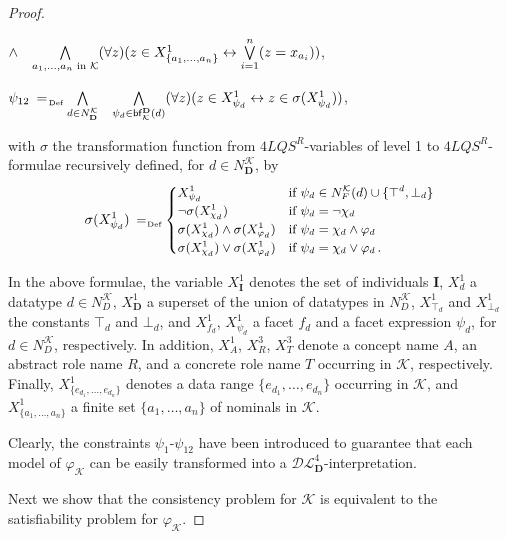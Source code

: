 \documentclass[a4paper]{llncs}
\newcommand{\defAs}{\mathrel{\makebox{\:= \hspace{-.2cm} \raisebox{-0.5 ex}[0 ex][0 ex]{\tiny Def}}}}
\newcommand{\shdlss}{\mathcal{DL}_{\D}^{4}}
\newcommand{\flqsr}{\ensuremath{4LQS^R}}
\newcommand{\I}{\mathbf{I}}
\newcommand{\D}{\mathbf{D}}
\newcommand{\bfk}{\mathsf{bf}_\mathcal{K}^{\D}}
\begin{document}
\begin{proof}
\begin{itemize}
{$\hfill \wedge \quad \underset {a_{1},\ldots, a_{n} \textrm{ in } \mathcal{K}} \bigwedge (\forall z)(z \in X_{\{a_{1},\ldots, a_{n}\}}^1 \leftrightarrow  \overset {n}{\underset {i=1} \bigvee}(z = x_{a_{i}}))$,

\item[-] $\psi_{12} \defAs \underset {d \in N_{\D}^\mathcal{K}} \bigwedge  \quad \underset {\psi_d \in \bfk(d)} \bigwedge (\forall z)(z \in X_{\psi_d}^1 \leftrightarrow z \in \sigma(X_{\psi_d}^1))$,
}


with $\sigma$ the transformation function from \flqsr-variables of level 1 to \flqsr-formulae recursively defined, for $d \in N_\D^\mathcal{K}$, by
\[ {\small
\sigma(X_{\psi_d}^1) \defAs \begin{cases}
X_{\psi_d}^1 & \text{if } \psi_d \in N_{F}^\mathcal{K}(d) \cup \{\top^{d},\bot_{d}\}\\
\neg \sigma(X_{\chi_d}^1) & \text{if }  \psi_d = \neg \chi_d\\
\sigma(X_{\chi_d}^1) \wedge \sigma(X_{\varphi_d}^1) & \text{if } \psi_d = \chi_d \wedge \varphi_d\\
\sigma(X_{\chi_d}^1) \vee \sigma(X_{\varphi_d}^1) & \text{if } \psi_d = \chi_d \vee \varphi_d\,.
\end{cases} }
\]


\end{itemize}


\noindent In the above formulae, the variable $X_{\I}^1$ denotes the set of individuals $\I$, $X_{d}^1$ a datatype $d \in N_{D}^\mathcal{K}$, $X_{\D}^1$  a superset of the union of datatypes in $ N_{D}^\mathcal{K}$, $X_{\top_d}^1$ and $X_{\bot_d}^1$ the constants $\top_d$ and $\bot_d$, and $X_{f_d}^1$, $X_{\psi_d}^1$ a facet $f_d$ and a facet expression $\psi_d$, for $d \in N_{D}^\mathcal{K}$, respectively. In addition, $X_{A}^1$, $X_{R}^3$, $X_{T}^3$ denote a concept name $A$, an abstract role name $R$, and a concrete role name $T$ occurring in $\mathcal{K}$, respectively. Finally, $X_{\{e_{d_1},\ldots,e_{d_n}\}}^1$ denotes a data range $\{e_{d_1},\ldots,e_{d_n}\}$ occurring in $\mathcal{K}$, and $X_{\{a_{1},\ldots,a_{n}\}}^1$ a finite set $\{a_1,\ldots,a_n\}$ of nominals in $\mathcal{K}$.

Clearly, the constraints $\psi_1$-$\psi_{12}$ have been introduced to guarantee that each model of $\varphi_{\mathcal{K}}$ can be easily transformed into a $\shdlss$-interpretation.

Next we show that the consistency problem for $\mathcal{K}$ is equivalent to the satisfiability problem for $\varphi_{\mathcal{K}}$.


\end{proof}
\end{document}
